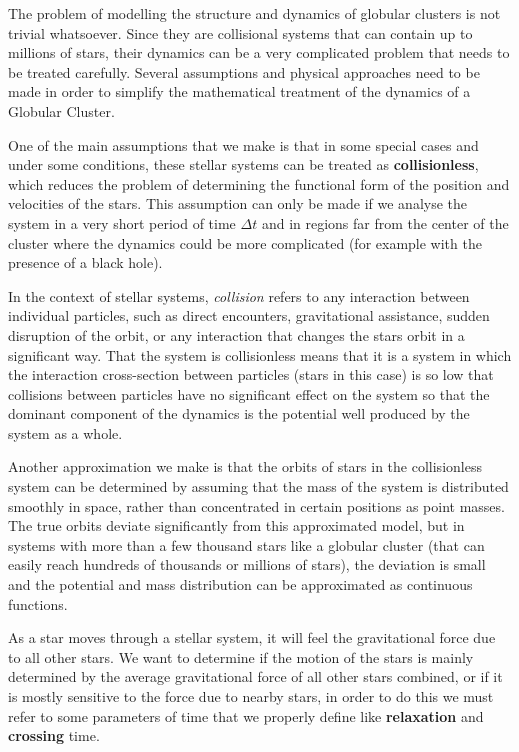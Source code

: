 The problem of modelling the structure and dynamics of globular clusters is not trivial whatsoever. Since they are collisional systems that can contain up to millions of stars, their dynamics can be a very complicated problem that needs to be treated carefully. Several assumptions and physical approaches need to be made in order to simplify the mathematical treatment of the dynamics of a Globular Cluster. 

One of the main assumptions that we make is that in some special cases and under some conditions, these stellar systems can be treated as \textbf{collisionless}, which reduces the problem of determining the functional form of the position and velocities of the stars. This assumption can only be made if we analyse the system in a very short period of time $\Delta t$ and in regions far from the center of the cluster where the dynamics could be more complicated (for example with the presence of a black hole).

In the context of stellar systems, \textit{collision} refers to any interaction between individual particles, such as direct encounters, gravitational assistance, sudden disruption of the orbit, or any interaction that changes the stars orbit in a significant way. That the system is collisionless means that it is a system in which the interaction cross-section between particles (stars in this case) is so low that collisions between particles have no significant effect on the system so that the dominant component of the dynamics is the potential well produced by the system as a whole.  

Another approximation we make is that the orbits of stars in the collisionless system can be determined by assuming that the mass of the system is distributed smoothly in space, rather than concentrated in certain positions as point masses. The true orbits deviate significantly from this approximated model, but in systems with more than a few thousand stars like a globular cluster (that can easily reach hundreds of thousands or millions of stars), the deviation is small and the potential and mass distribution can be approximated as continuous functions. 

As a star moves through a stellar system, it will feel the gravitational force due to all other stars. We want to determine if the motion of the stars is mainly determined by the average gravitational force of all other stars combined, or if it is mostly sensitive to the force due to nearby stars, in order to do this we must refer to some parameters of time that we properly define like \textbf{relaxation} and \textbf{crossing} time. 

